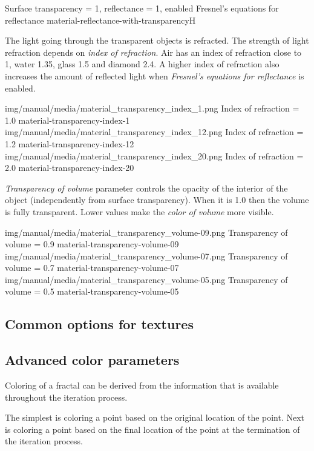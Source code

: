 {Surface transparency = 1, reflectance = 1, enabled Fresnel's equations for reflectance}
{material-reflectance-with-transparency}{H}

The light going through the transparent objects is refracted. The strength of light refraction depends on \emph{index of refraction}. Air has an index of refraction close to 1, water 1.35, glass 1.5 and diamond 2.4. A higher index of refraction also increases the amount of reflected light when \emph{Fresnel's equations for reflectance} is enabled.

\threeImagesWithTwoCaptionsFullWidth
{img/manual/media/material_transparency_index_1.png}
{Index of refraction = 1.0}
{material-transparency-index-1}
{img/manual/media/material_transparency_index_12.png}
{Index of refraction = 1.2}
{material-transparency-index-12}
{img/manual/media/material_transparency_index_20.png}
{Index of refraction = 2.0}
{material-transparency-index-20}

\emph{Transparency of volume} parameter controls the opacity of the interior of the object (independently from surface transparency). When it is 1.0 then the volume is fully transparent. Lower values make  the \emph{color of volume} more visible.

\threeImagesWithTwoCaptionsFullWidth
{img/manual/media/material_transparency_volume-09.png}
{Transparency of volume = 0.9}
{material-transparency-volume-09}
{img/manual/media/material_transparency_volume-07.png}
{Transparency of volume = 0.7}
{material-transparency-volume-07}
{img/manual/media/material_transparency_volume-05.png}
{Transparency of volume = 0.5}
{material-transparency-volume-05}

\subsection{Common options for textures}\label{materials-textures}

\subsection{Advanced color parameters}\label{materials-advanced-color-parameters}

Coloring of a fractal can be derived from the information that is available throughout the iteration process.

The simplest is coloring a point based on the original location of the point.
Next is coloring a point based on the final location of the point at the termination of the iteration process.

